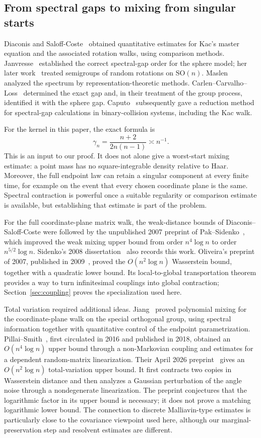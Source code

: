 \documentclass[11pt]{article}
\theoremstyle{definition}\newtheorem{definition}[theorem]{Definition}
\theoremstyle{remark}\newtheorem{remark}[theorem]{Remark}
\newcommand{\SO}{\mathrm{SO}}
\begin{document}
\subsection{From spectral gaps to mixing from singular starts}
Diaconis and Saloff-Coste~\cite{DSC00} obtained quantitative estimates for Kac's master equation and the associated rotation walks, using comparison methods. Janvresse~\cite{Janvresse01} established the correct spectral-gap order for the sphere model; her later work~\cite{Janvresse03} treated semigroups of random rotations on $\SO(n)$. Maslen~\cite{Maslen03} analyzed the spectrum by representation-theoretic methods. Carlen--Carvalho--Loss~\cite{CCL} determined the exact gap and, in their treatment of the group process, identified it with the sphere gap. Caputo~\cite{Caputo08} subsequently gave a reduction method for spectral-gap calculations in binary-collision systems, including the Kac walk.

For the kernel in this paper, the exact formula is
\[
 \gamma_n=\frac{n+2}{2n(n-1)}\asymp n^{-1}.
\]
This is an input to our proof. It does not alone give a worst-start mixing estimate: a point mass has no square-integrable density relative to Haar. Moreover, the full endpoint law can retain a singular component at every finite time, for example on the event that every chosen coordinate plane is the same. Spectral contraction is powerful once a suitable regularity or comparison estimate is available, but establishing that estimate is part of the problem.

For the full coordinate-plane matrix walk, the weak-distance bounds of Diaconis--Saloff-Coste were followed by the unpublished 2007 preprint of Pak--Sidenko~\cite{PakSidenko07}, which improved the weak mixing upper bound from order $n^4\log n$ to order $n^{5/2}\log n$. Sidenko's 2008 dissertation~\cite{Sidenko08} also records this work. Oliveira's preprint of 2007, published in 2009~\cite{Oliveira}, proved the $O(n^2\log n)$ Wasserstein bound, together with a quadratic lower bound. Its local-to-global transportation theorem provides a way to turn infinitesimal couplings into global contraction; Section~\ref{sec:coupling} proves the specialization used here.

Total variation required additional ideas. Jiang~\cite{Jiang17} proved polynomial mixing for the coordinate-plane walk on the special orthogonal group, using spectral information together with quantitative control of the endpoint parametrization. Pillai--Smith~\cite{PS18}, first circulated in 2016 and published in 2018, obtained an $O(n^4\log n)$ upper bound through a non-Markovian coupling and estimates for a dependent random-matrix linearization. Their April 2026 preprint~\cite{PS26} gives an $O(n^2\log n)$ total-variation upper bound. It first contracts two copies in Wasserstein distance and then analyzes a Gaussian perturbation of the angle noise through a nondegenerate linearization. The preprint conjectures that the logarithmic factor in its upper bound is necessary; it does not prove a matching logarithmic lower bound. The connection to discrete Malliavin-type estimates is particularly close to the covariance viewpoint used here, although our marginal-preservation step and resolvent estimates are different.
\end{document}
